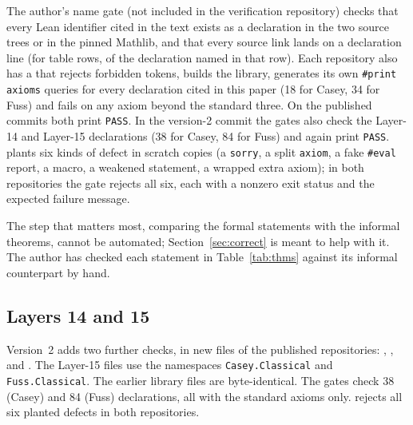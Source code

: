 \documentclass[11pt]{article}
\theoremstyle{definition}
\theoremstyle{remark}
\newcommand{\code}[1]{\texttt{#1}}
\begin{document}
The author's name gate  (not included in the verification repository) checks that every Lean identifier cited
in the text exists as a declaration in the two source trees or in the pinned Mathlib, and that every
source link lands on a declaration line (for table rows, of the declaration named in that row).
Each repository also has a  that rejects forbidden tokens, builds the library,
generates its own \code{\#print axioms} queries for every declaration cited in this paper (18 for
Casey, 34 for Fuss) and fails on any axiom beyond the standard three. On the published commits both
print \code{PASS}. In the version-2 commit the gates also check the Layer-14 and Layer-15
declarations (38 for Casey, 84 for Fuss) and again print \code{PASS}.  plants six kinds of defect in scratch copies (a
\code{sorry}, a split \code{axiom}, a fake \code{\#eval} report, a macro, a weakened statement, a
wrapped extra axiom); in both repositories the gate rejects all six, each with a nonzero exit status
and the expected failure message.

The step that matters most, comparing the formal statements with the informal theorems, cannot be
automated; Section~\ref{sec:correct} is meant to help with it.
The author has checked each statement in Table~\ref{tab:thms} against its informal counterpart by hand.

\subsection{Layers 14 and 15}\label{sec:l1415}

Version~2 adds two further checks, in new files of the published repositories:
, ,  and
. The Layer-15 files use the namespaces \code{Casey.Classical} and
\code{Fuss.Classical}. The earlier library files are byte-identical. The gates check 38 (Casey) and 84
(Fuss) declarations, all with the standard axioms only.  rejects all six planted
defects in both repositories.
\end{document}
